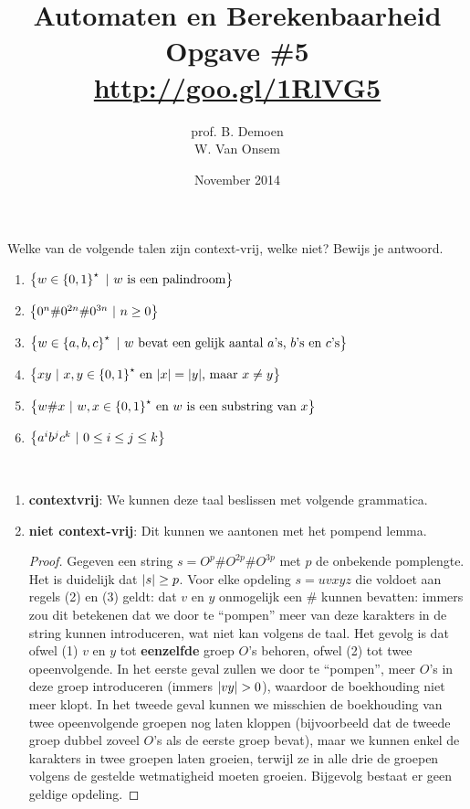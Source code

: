 \documentclass[a4paper]{article}
\title{Automaten en Berekenbaarheid\\Opgave \#5\\\url{http://goo.gl/1RlVG5}}
\author{prof. B. Demoen\\W. Van Onsem}
\date{November 2014}
\begin{document}
\maketitle

\begin{question}
Welke van de volgende talen zijn context-vrij, welke niet? Bewijs je antwoord.
  \begin{enumerate}
    \item $\left\{ w\in \left\{ 0,1 \right\}^{\star}\ |\ \mbox{$w$ is een palindroom} \right\}$
    \item $\left\{ 0^n\#0^{2n}\#0^{3n}\ |\ n\geq 0 \right\}$
    \item $\left\{ w\in\left\{ a,b,c \right\}^{\star}\ |\ \mbox{$w$ bevat een gelijk aantal $a$'s, $b$'s en $c$'s} \right\}$
    \item $\left\{ xy\ |\ \mbox{$x,y\in\left\{ 0,1 \right\}^{\star}$ en $\left|x\right|=\left|y\right|$, maar $x \neq y$} \right\}$
    \item $\left\{ w\#x\ |\ \mbox{$w,x\in\left\{ 0,1 \right\}^{\star}$ en $w$ is een substring van $x$} \right\}$
    \item $\left\{ a^ib^jc^k\ |\ 0\leq i\leq j\leq k \right\}$
  \end{enumerate}
\begin{answer}~~
\begin{enumerate}
\item \textbf{contextvrij}: We kunnen deze taal beslissen met volgende grammatica.
\item \textbf{niet context-vrij}: Dit kunnen we aantonen met het pompend lemma.
\begin{proof}
Gegeven een string $s=O^p\#O^{2p}\#O^{3p}$ met $p$ de onbekende pomplengte. Het is duidelijk dat $\left|s\right|\geq p$. Voor elke opdeling $s=uvxyz$ die voldoet aan regels (2) en (3) geldt: dat $v$ en $y$ onmogelijk een $\#$ kunnen bevatten: immers zou dit betekenen dat we door te ``pompen'' meer van deze karakters in de string kunnen introduceren, wat niet kan volgens de taal. Het gevolg is dat ofwel (1) $v$ en $y$ tot \textbf{eenzelfde} groep $O$'s behoren, ofwel (2) tot twee opeenvolgende. In het eerste geval zullen we door te ``pompen'', meer $O$'s in deze groep introduceren (immers $\abs{vy}>0$), waardoor de boekhouding niet meer klopt. In het tweede geval kunnen we misschien de boekhouding van twee opeenvolgende groepen nog laten kloppen (bijvoorbeeld dat de tweede groep dubbel zoveel $O$'s als de eerste groep bevat), maar we kunnen enkel de karakters in twee groepen laten groeien, terwijl ze in alle drie de groepen volgens de gestelde wetmatigheid moeten groeien. Bijgevolg bestaat er geen geldige opdeling.

\end{proof}
\end{enumerate}
\end{answer}
\end{question}
\end{document}
